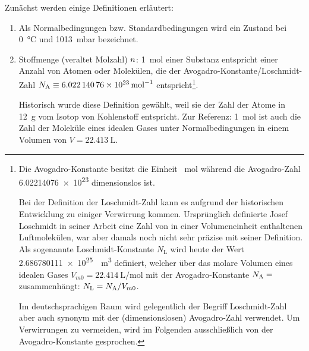 Zunächst werden einige Definitionen erläutert:
\begin{enumerate}
    \item Als Normalbedingungen bzw. Standardbedingungen wird ein Zustand bei \SI{0}{\degreeCelsius} und \SI{1013}{\milli\bar} bezeichnet.
    \item Stoffmenge (veraltet Molzahl) $n$: \SI{1}{\mole} einer Substanz entspricht einer Anzahl von Atomen oder Molekülen, die der Avogadro-Konstante/Loschmidt-Zahl $N_\mathrm{A} \equiv \SI{6,02214076e23}{\per\mole}$ entspricht\footnote{
          Die Avogadro-Konstante besitzt die Einheit \si{\per\mole} während die Avogadro-Zahl \num{6,02214076e23} dimensionslos ist.

          Bei der Definition der Loschmidt-Zahl kann es aufgrund der historischen Entwicklung zu einiger Verwirrung kommen. Ursprünglich definierte Josef Loschmidt in seiner Arbeit  eine Zahl von in einer Volumeneinheit enthaltenen Luftmolekülen, war aber damals noch nicht sehr präzise mit seiner Definition. Als sogenannte Loschmidt-Konstante $N_\mathrm{L}$ wird heute der Wert \SI{2.686780111e25}{\per\cubic\m} definiert, welcher über das molare Volumen eines idealen Gases $V_{m0} = \SI{22,414}{\liter\per\mole}$ mit der Avogadro-Konstante $N_\mathrm{A}=$ zusammenhängt: $N_\mathrm{L}=N_\mathrm{A}/V_{m0}$.\cite{lit:loschmidt_constant,lit:loschmidt}

          Im deutschsprachigen Raum wird gelegentlich der Begriff Loschmidt-Zahl aber auch synonym mit der (dimensionslosen) Avogadro-Zahl verwendet. Um Verwirrungen zu vermeiden, wird im Folgenden ausschließlich von der Avogadro-Konstante gesprochen.}.

          Historisch wurde diese Definition gewählt, weil sie der Zahl der Atome in \SI{12}{\g} vom Isotop  von Kohlenstoff entspricht.
          Zur Referenz: \SI{1}{\mole} ist auch die Zahl der Moleküle eines idealen Gases unter Normalbedingungen in einem Volumen von $V=\SI{22,413}{\liter}$.


\end{enumerate}
